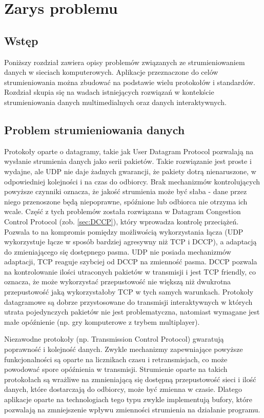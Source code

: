 \chapter{Zarys problemu}
\label{cha:rozdzial2}

\section{Wstęp}

Poniższy rozdział zawiera opisy problemów związanych ze strumieniowaniem danych w sieciach komputerowych. Aplikacje przeznaczone do celów strumieniowania można zbudować na podstawie wielu protokołów i standardów. Rozdział skupia się na wadach istniejących rozwiązań w kontekście strumieniowania danych multimedialnych oraz danych interaktywnych.

\section{Problem strumieniowania danych}

Protokoły oparte o datagramy, takie jak User Datagram Protocol pozwalają na wysłanie strumienia danych jako serii pakietów. Takie rozwiązanie jest proste i wydajne, ale UDP nie daje żadnych gwarancji, że pakiety dotrą nienaruszone, w odpowiedniej kolejności i na czas do odbiorcy. Brak mechanizmów kontrolujących powyższe czynniki oznacza, że jakość strumienia może być słaba - dane przez niego przenoszone będą niepoprawne, spóźnione lub odbiorca nie otrzyma ich wcale. Część z tych problemów została rozwiązana w Datagram Congestion Control Protocol (zob. \ref{sec:DCCP}), który wprowadza kontrolę przeciążeń. Pozwala to na kompromis pomiędzy możliwością wykorzystania łącza (UDP wykorzystuje łącze w sposób bardziej agresywny niż TCP i DCCP), a adaptacją do zmieniającego się dostępnego pasma. UDP nie posiada mechanizmów adaptacji, TCP reaguje szybciej od DCCP na zmienność pasma. DCCP pozwala na kontrolowanie ilości utraconych pakietów w transmisji i jest TCP friendly, co oznacza, że może wykorzystać przepustowość nie większą niż dwukrotna przepustowość jaką wykorzystałoby TCP w tych samych warunkach. Protokoły datagramowe są dobrze przystosowane do transmisji interaktywnych w których utrata pojedynczych pakietów nie jest problematyczna, natomiast wymagane jest małe opóźnienie (np. gry komputerowe z trybem multiplayer).

Niezawodne protokoły (np. Transmission Control Protocol) gwaratują poprawność i kolejność danych. Zwykle mechanizmy zapewniające powyższe funkcjonalności są oparte na licznikach czasu i retransmisjach, co może powodować spore opóźnienia w transmisji. Strumienie oparte na takich protokołach są wrażliwe na zmnieniającą się dostępną przepustowość sieci i ilość danych, które dostarczają do odbiorcy, może być zmienna w czasie. Dlatego aplikacje oparte na technologiach tego typu zwykle implementują bufory, które pozwalają na zmniejszenie wpływu zmienności strumienia na działanie programu.

